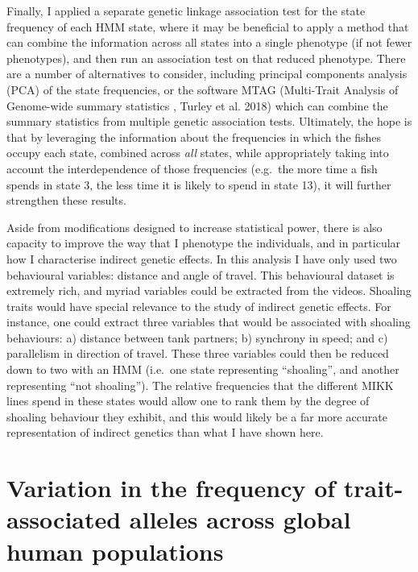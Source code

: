 \documentclass[
]{book}
\begin{document}
Finally, I applied a separate genetic linkage association test for the state frequency of each HMM state, where it may be beneficial to apply a method that can combine the information across all states into a single phenotype (if not fewer phenotypes), and then run an association test on that reduced phenotype. There are a number of alternatives to consider, including principal components analysis (PCA) of the state frequencies, or the software MTAG (Multi-Trait Analysis of Genome-wide summary statistics , Turley et al. 2018) which can combine the summary statistics from multiple genetic association tests. Ultimately, the hope is that by leveraging the information about the frequencies in which the fishes occupy each state, combined across \emph{all} states, while appropriately taking into account the interdependence of those frequencies (e.g.~the more time a fish spends in state 3, the less time it is likely to spend in state 13), it will further strengthen these results.

Aside from modifications designed to increase statistical power, there is also capacity to improve the way that I phenotype the individuals, and in particular how I characterise indirect genetic effects. In this analysis I have only used two behavioural variables: distance and angle of travel. This behavioural dataset is extremely rich, and myriad variables could be extracted from the videos. Shoaling traits would have special relevance to the study of indirect genetic effects. For instance, one could extract three variables that would be associated with shoaling behaviours: a) distance between tank partners; b) synchrony in speed; and c) parallelism in direction of travel. These three variables could then be reduced down to two with an HMM (i.e.~one state representing ``shoaling'', and another representing ``not shoaling''). The relative frequencies that the different MIKK lines spend in these states would allow one to rank them by the degree of shoaling behaviour they exhibit, and this would likely be a far more accurate representation of indirect genetics than what I have shown here.

\hypertarget{Fst-chap}{%
\chapter{Variation in the frequency of trait-associated alleles across global human populations}\label{Fst-chap}}

\end{document}
